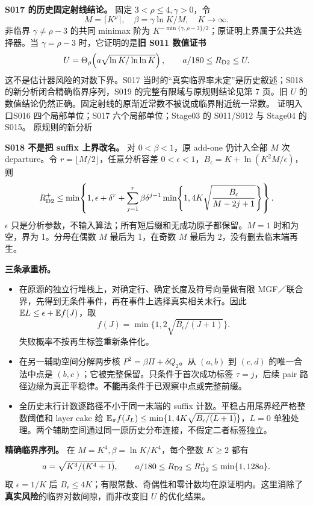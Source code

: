 \documentclass[11pt,a4paper]{article}
\newcommand{\head}[2]{{\small\sffamily #1}\par\vspace{2pt}{\LARGE\bfseries #2}\par\vspace{5pt}}
\newcommand{\entry}[1]{\vfill\noindent\small 证明入口\quad #1\normalsize}
\begin{document}
\textbf{S017 的历史固定射线结论。} 固定 $3<\rho\le4,\gamma>0$，令
\[
 M=\lceil K^\rho\rceil,\quad\beta=\gamma\ln K/M,\quad K\to\infty.
\]
非临界 $\gamma\ne\rho-3$ 的共同 minimax 阶为
$K^{-\min\{\gamma,\rho-3\}/2}$；原证明上界属于公共选择器。当 $\gamma=\rho-3$ 时，它证明的是\textbf{旧 S011 数值证书}
\[
 U=\Theta_\rho\!\left(a\sqrt{\ln K/\ln\ln K}\right),\qquad a/180\le R_{\mathrm{D2}}\le U.
\]
这不是估计器风险的对数下界。S017 当时的“真实临界率未定”是历史叙述；S018 的新分析闭合精确临界序列，S019 的完整有限域与原规则结论见第 7 页。旧 $U$ 的数值结论仍然正确。固定射线的原渐近常数不被说成临界附近统一常数。
\entry{S016 四个局部单位；S017 六个局部单位；Stage03 的 S011/S012 与 Stage04 的 S015。}
\newpage
\head{原规则的新分析}{再生末行计数消除精确临界间隙}
\textbf{S018 不是把 suffix 上界改名。} 对 $0<\beta<1$，原 add-one 仍计入全部 $M$ 次 departure。令 $r=\lfloor M/2\rfloor$，任意分析容差 $0<\epsilon<1$，$B_\epsilon=K+\ln(K^2M/\epsilon)$，则
\[
 R_{\mathrm{D2}}^+\le\min\!\left\{1,\epsilon+\delta^r+
 \sum_{j=1}^{r}\beta\delta^{j-1}
       \min\!\left\{1,4K\sqrt{\frac{B_\epsilon}{M-2j+1}}\right\}\right\}.
\]
$\epsilon$ 只是分析参数，不输入算法；所有短后缀和无成功原子都保留。$M=1$ 时和为空，界为 1。分母在偶数 $M$ 最后为 1，在奇数 $M$ 最后为 2，没有删去临末端再生。

\textbf{三条承重桥。}
\begin{itemize}
\item 在原源的独立行堆栈上，对确定行、确定长度及符号向量做有限 MGF／联合界，先得到无条件事件，再在事件上选择真实相关末行。因此 $\mathbb E L\le\epsilon+\mathbb E f(J)$，取\[f(J)=\min\{1,2\sqrt{B_\epsilon/(J+1)}\}.\]失败概率不按再生标签重新条件化。
\item 在另一辅助空间分解两步核 $P^2=\beta\Pi+\delta Q_2$。从 $(a,b)$ 到 $(c,d)$ 的唯一合法中点是 $(b,c)$；它被完整保留。只条件于首次成功标签 $\tau=j$，后续 pair 路径边缘为真正平稳律。\textbf{不能}再条件于已观察中点或完整前缀。
\item 全历史末行计数逐路径不小于同一末端的 suffix 计数。平稳占用尾界经严格整数阈值和 layer cake 给 $\mathbb E_\pi f(J_L)\le\min\{1,4K\sqrt{B_\epsilon/(L+1)}\}$，$L=0$ 单独处理。两个辅助空间通过同一原历史分布连接，不假定二者标签独立。
\end{itemize}
\textbf{精确临界序列。} 在 $M=K^4,\beta=\ln K/K^4$，每个整数 $K\ge2$ 都有
\[
 a=\sqrt{K^3/(K^4+1)},\qquad
 a/180\le R_{\mathrm{D2}}\le R_{\mathrm{D2}}^+\le\min\{1,128a\}.
\]
取 $\epsilon=1/K$ 后 $B_\epsilon\le4K$；有限常数、奇偶性和零计数均在原证明内。这里消除了\textbf{真实风险}的临界对数间隙，而非改变旧 $U$ 的优化结果。
\end{document}
